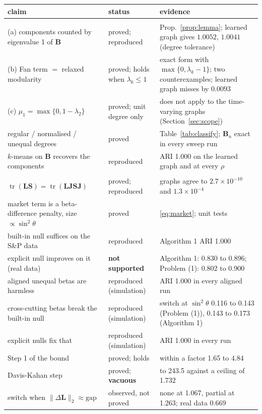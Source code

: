 \documentclass[11pt,a4paper]{article}
\newcommand{\Lap}{\mathbf{L}}
\newcommand{\Bmat}{\mathbf{B}}
\newcommand{\Smat}{\mathbf{S}}
\newcommand{\Jmat}{\mathbf{J}}
\newcommand{\tr}{\operatorname{tr}}
\theoremstyle{remark}
\begin{document}
\begin{center}
\small
\renewcommand{\arraystretch}{1.2}
\begin{tabular}{>{\raggedright\arraybackslash}p{5.3cm}>{\raggedright\arraybackslash}p{2.7cm}>{\raggedright\arraybackslash}p{6.6cm}}
\toprule
claim & status & evidence \\
\midrule
\multicolumn{3}{l}{\textit{Part I}} \\
(a) components counted by eigenvalue 1 of $\Bmat$ & proved; reproduced & Prop.~\ref{prop:lemma}; learned graph gives $1.0052$, $1.0041$ (degree tolerance) \\
(b) Fan term $=$ relaxed modularity & proved; holds when $\lambda_k\le1$ & exact form with $\max\{0,\lambda_k-1\}$; two counterexamples; learned graph misses by $0.0093$ \\
(c) $\mu_1=\max\{0,1-\lambda_2\}$ & proved; unit degree only & does not apply to the time-varying graphs (Section~\ref{sec:scope}) \\
regular / normalised / unequal degrees & proved & Table~\ref{tab:classify}; $\Bmat_n$ exact in every sweep run \\
$k$-means on $\Bmat$ recovers the components & reproduced & ARI 1.000 on the learned graph and at every $\rho$ \\
\multicolumn{3}{l}{\textit{Part II}} \\
$\tr(\Lap\Smat)=\tr(\Lap\Jmat\Smat\Jmat)$ & proved; reproduced & graphs agree to $2.7\times10^{-10}$ and $1.3\times10^{-4}$ \\
market term is a beta-difference penalty, size $\propto\sin^2\theta$ & proved & \eqref{eq:market}; unit tests \\
built-in null suffices on the S\&P data & reproduced & Algorithm 1 ARI 1.000 \\
explicit null improves on it (real data) & \textbf{not supported} & Algorithm 1: 0.830 to 0.896; Problem (1): 0.802 to 0.900 \\
aligned unequal betas are harmless & reproduced (simulation) & ARI 1.000 in every aligned run \\
cross-cutting betas break the built-in null & reproduced (simulation) & switch at $\sin^2\theta$ 0.116 to 0.143 (Problem (1)), 0.143 to 0.173 (Algorithm 1) \\
explicit nulls fix that & reproduced (simulation) & ARI 1.000 in every run \\
Step 1 of the bound & proved; holds & within a factor 1.65 to 4.84 \\
Davis-Kahan step & proved; \textbf{vacuous} & 10.9 to 243.5 against a ceiling of 1.732 \\
switch when $\lVert\Delta\Lap\rVert_2\approx\mathrm{gap}$ & observed, not proved & none at 1.067, partial at 1.263; real data 0.669 \\
\bottomrule
\end{tabular}
\end{center}
\end{document}
